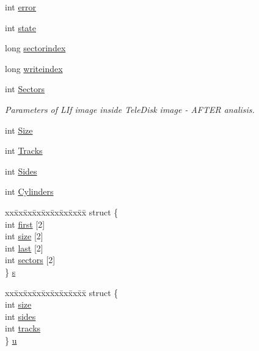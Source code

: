\begin{DoxyCompactItemize}
\item 
int \hyperlink{structliftel__t_abc69ee3835be72037c41a11b7457cecd}{error}
\item 
int \hyperlink{structliftel__t_a579b9a2411fc6cf4bcdd4cac15d48e49}{state}
\item 
long \hyperlink{structliftel__t_a13e9f8b2e23d8f028f456d4465beb4d5}{sectorindex}
\item 
long \hyperlink{structliftel__t_a3c5f11408ea86ded8a0bc0d20a0ea689}{writeindex}
\item 
int \hyperlink{structliftel__t_aa20cc45cd196c86b7d6176914226eacf}{Sectors}
\begin{DoxyCompactList}\small\item\em Parameters of L\+If image inside Tele\+Disk image -\/ A\+F\+T\+ER analisis. \end{DoxyCompactList}\item 
int \hyperlink{structliftel__t_a9fe4b5bc923dd0ac989c7f0cacf19d30}{Size}
\item 
int \hyperlink{structliftel__t_a1c433cb2546f09c4093f0e98d61212b2}{Tracks}
\item 
int \hyperlink{structliftel__t_a1fafd0f113738152a2ae6251c2f528f7}{Sides}
\item 
int \hyperlink{structliftel__t_aa7893691b509641459d8c1c0a8664aa5}{Cylinders}
\item 
\begin{tabbing}
xx\=xx\=xx\=xx\=xx\=xx\=xx\=xx\=xx\=\kill
struct \{\\
\>int \hyperlink{structliftel__t_a2269b4ce15afd4b98369c38752d31037}{first} \mbox{[}2\mbox{]}\\
\>int \hyperlink{structliftel__t_a7c0102997f04b216d2ec895495899b7f}{size} \mbox{[}2\mbox{]}\\
\>int \hyperlink{structliftel__t_accda68319750f6ea7a63948fb0d7d223}{last} \mbox{[}2\mbox{]}\\
\>int \hyperlink{structliftel__t_a04c852b0fdc7a7c04d558d9a201f3f0d}{sectors} \mbox{[}2\mbox{]}\\
\} \hyperlink{structliftel__t_a73a275fa51f9aa617d3975ac29d1befa}{s}\\

\end{tabbing}\item 
\begin{tabbing}
xx\=xx\=xx\=xx\=xx\=xx\=xx\=xx\=xx\=\kill
struct \{\\
\>int \hyperlink{structliftel__t_a7c0102997f04b216d2ec895495899b7f}{size}\\
\>int \hyperlink{structliftel__t_aabd804e27f6ab37de1ef9b890a0f1088}{sides}\\
\>int \hyperlink{structliftel__t_a24244c0ee111d3f46eedd7578eb1acf7}{tracks}\\
\} \hyperlink{structliftel__t_a039066f2594254d80396de7e4c1bf106}{u}\\

\end{tabbing}\end{DoxyCompactItemize}


